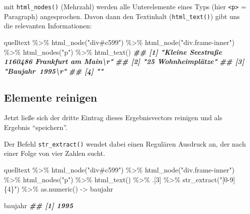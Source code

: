 \documentclass[
  ngerman,
]{article}
\newenvironment{Shaded}{\begin{snugshade}}{\end{snugshade}}
\newcommand{\DecValTok}[1]{\textcolor[rgb]{0.00,0.00,0.81}{#1}}
\newcommand{\DocumentationTok}[1]{\textcolor[rgb]{0.56,0.35,0.01}{\textbf{\textit{#1}}}}
\newcommand{\FunctionTok}[1]{\textcolor[rgb]{0.00,0.00,0.00}{#1}}
\newcommand{\NormalTok}[1]{#1}
\newcommand{\OtherTok}[1]{\textcolor[rgb]{0.56,0.35,0.01}{#1}}
\newcommand{\SpecialCharTok}[1]{\textcolor[rgb]{0.00,0.00,0.00}{#1}}
\newcommand{\StringTok}[1]{\textcolor[rgb]{0.31,0.60,0.02}{#1}}
\begin{document}
mit \texttt{html\_nodes()} (Mehrzahl) werden alle Unterelemente eines Typs (hier \texttt{\textless{}p\textgreater{}} = Paragraph) angesprochen. Davon dann den Textinhalt (\texttt{html\_text()}) gibt uns die relevanten Informationen:

\begin{Shaded}
\begin{Highlighting}[]
\NormalTok{quelltext }\SpecialCharTok{\%\textgreater{}\%}
  \FunctionTok{html\_node}\NormalTok{(}\StringTok{"div\#c599"}\NormalTok{) }\SpecialCharTok{\%\textgreater{}\%}
  \FunctionTok{html\_node}\NormalTok{(}\StringTok{"div.frame{-}inner"}\NormalTok{) }\SpecialCharTok{\%\textgreater{}\%}
  \FunctionTok{html\_nodes}\NormalTok{(}\StringTok{"p"}\NormalTok{) }\SpecialCharTok{\%\textgreater{}\%}
  \FunctionTok{html\_text}\NormalTok{()}
\DocumentationTok{\#\# [1] "Kleine Seestraße 1160486 Frankfurt am Main\textbackslash{}r"}
\DocumentationTok{\#\# [2] "25 Wohnheimplätze"                           }
\DocumentationTok{\#\# [3] "Baujahr 1995\textbackslash{}r"                              }
\DocumentationTok{\#\# [4] ""}
\end{Highlighting}
\end{Shaded}

\hypertarget{elemente-reinigen}{%
\subsection{Elemente reinigen}\label{elemente-reinigen}}

Jetzt ließe sich der dritte Eintrag dieses Ergebnisvectors reinigen und als Ergebnis ``speichern''.

Der Befehl \texttt{str\_extract()} wendet dabei einen Regulären Ausdruck an, der nach einer Folge von vier Zahlen sucht.

\begin{Shaded}
\begin{Highlighting}[]
\NormalTok{quelltext }\SpecialCharTok{\%\textgreater{}\%}
  \FunctionTok{html\_node}\NormalTok{(}\StringTok{"div\#c599"}\NormalTok{) }\SpecialCharTok{\%\textgreater{}\%}
  \FunctionTok{html\_node}\NormalTok{(}\StringTok{"div.frame{-}inner"}\NormalTok{) }\SpecialCharTok{\%\textgreater{}\%}
  \FunctionTok{html\_nodes}\NormalTok{(}\StringTok{"p"}\NormalTok{) }\SpecialCharTok{\%\textgreater{}\%}
  \FunctionTok{html\_text}\NormalTok{() }\SpecialCharTok{\%\textgreater{}\%}
\NormalTok{  .[}\DecValTok{3}\NormalTok{] }\SpecialCharTok{\%\textgreater{}\%}
  \FunctionTok{str\_extract}\NormalTok{(}\StringTok{"[0{-}9]\{4\}"}\NormalTok{) }\SpecialCharTok{\%\textgreater{}\%}
  \FunctionTok{as.numeric}\NormalTok{() }\OtherTok{{-}\textgreater{}}\NormalTok{ baujahr}

\NormalTok{baujahr}
\DocumentationTok{\#\# [1] 1995}
\end{Highlighting}
\end{Shaded}
\end{document}
